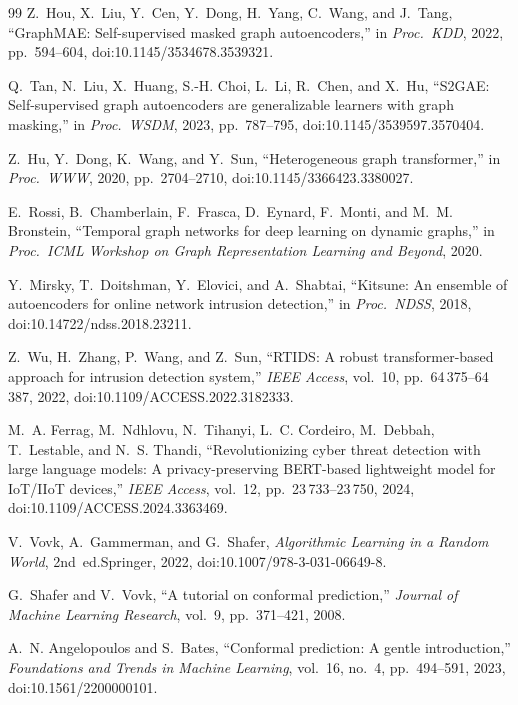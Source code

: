 \documentclass[journal,twoside]{IEEEtran}
\begin{document}
\begin{thebibliography}{99}
Z.~Hou, X.~Liu, Y.~Cen, Y.~Dong, H.~Yang, C.~Wang, and J.~Tang,
``GraphMAE: Self-supervised masked graph autoencoders,''
in \emph{Proc.\ KDD}, 2022, pp.~594--604,
doi:10.1145/3534678.3539321.

Q.~Tan, N.~Liu, X.~Huang, S.-H. Choi, L.~Li, R.~Chen, and X.~Hu,
``S2GAE: Self-supervised graph autoencoders are generalizable learners
with graph masking,''
in \emph{Proc.\ WSDM}, 2023, pp.~787--795,
doi:10.1145/3539597.3570404.

Z.~Hu, Y.~Dong, K.~Wang, and Y.~Sun,
``Heterogeneous graph transformer,''
in \emph{Proc.\ WWW}, 2020, pp.~2704--2710,
doi:10.1145/3366423.3380027.

E.~Rossi, B.~Chamberlain, F.~Frasca, D.~Eynard, F.~Monti, and M.~M. Bronstein,
``Temporal graph networks for deep learning on dynamic graphs,''
in \emph{Proc.\ ICML Workshop on Graph Representation Learning and
Beyond}, 2020.

Y.~Mirsky, T.~Doitshman, Y.~Elovici, and A.~Shabtai,
``Kitsune: An ensemble of autoencoders for online network intrusion
detection,''
in \emph{Proc.\ NDSS}, 2018, doi:10.14722/ndss.2018.23211.

Z.~Wu, H.~Zhang, P.~Wang, and Z.~Sun,
``RTIDS: A robust transformer-based approach for intrusion detection
system,''
\emph{IEEE Access}, vol.~10, pp.~64\,375--64\,387, 2022,
doi:10.1109/ACCESS.2022.3182333.

M.~A. Ferrag, M.~Ndhlovu, N.~Tihanyi, L.~C. Cordeiro, M.~Debbah,
T.~Lestable, and N.~S. Thandi,
``Revolutionizing cyber threat detection with large language models: A
privacy-preserving BERT-based lightweight model for IoT/IIoT devices,''
\emph{IEEE Access}, vol.~12, pp.~23\,733--23\,750, 2024,
doi:10.1109/ACCESS.2024.3363469.

V.~Vovk, A.~Gammerman, and G.~Shafer,
\emph{Algorithmic Learning in a Random World}, 2nd~ed.\quad Springer,
2022, doi:10.1007/978-3-031-06649-8.

G.~Shafer and V.~Vovk,
``A tutorial on conformal prediction,''
\emph{Journal of Machine Learning Research}, vol.~9, pp.~371--421, 2008.

A.~N. Angelopoulos and S.~Bates,
``Conformal prediction: A gentle introduction,''
\emph{Foundations and Trends in Machine Learning}, vol.~16, no.~4,
pp.~494--591, 2023, doi:10.1561/2200000101.


\end{thebibliography}
\end{document}
